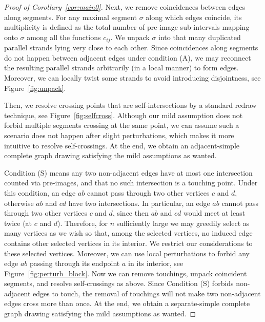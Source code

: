\documentclass[10pt,a4paper]{amsart}
\begin{document}
\begin{proof}[Proof of Corollary~\ref{cor:main0}]
Next, we remove coincidences between edges along segments. For any maximal segment $\sigma$ along which edges coincide, its multiplicity is defined as the total number of pre-image sub-intervals mapping onto $\sigma$ among all the functions $c_{ij}$. We unpack $\sigma$ into that many duplicated parallel strands lying very close to each other. Since coincidences along segments do not happen between adjacent edges under condition (A), we may reconnect the resulting parallel strands arbitrarily (in a local manner) to form edges. Moreover, we can locally twist some strands to avoid introducing disjointness, see Figure~\ref{fig:unpack}.

Then, we resolve crossing points that are self-intersections by a standard redraw technique, see Figure~\ref{fig:selfcross}. Although our mild assumption does not forbid multiple segments crossing at the same point, we can assume such a scenario does not happen after slight perturbations, which makes it more intuitive to resolve self-crossings. At the end, we obtain an adjacent-simple complete graph drawing satisfying the mild assumptions as wanted.

Condition (S) means any two non-adjacent edges have at most one intersection counted via pre-images, and that no such intersection is a touching point. Under this condition, an edge $ab$ cannot pass through two other vertices $c$ and $d$, otherwise $ab$ and $cd$ have two intersections. In particular, an edge $ab$ cannot pass through two other vertices $c$ and $d$, since then $ab$ and $cd$ would meet at least twice (at $c$ and $d$). Therefore, for $n$ sufficiently large we may greedily select as many vertices as we wish so that, among the selected vertices, no induced edge contains other selected vertices in its interior. We restrict our considerations to these selected vertices. Moreover, we can use local perturbations to forbid any edge $ab$ passing through its endpoint $a$ in its interior, see Figure~\ref{fig:perturb_block}. Now we can remove touchings, unpack coincident segments, and resolve self-crossings as above. Since Condition (S) forbids non-adjacent edges to touch, the removal of touchings will not make two non-adjacent edges cross more than once. At the end, we obtain a separate-simple complete graph drawing satisfying the mild assumptions as wanted.


\end{proof}
\end{document}
